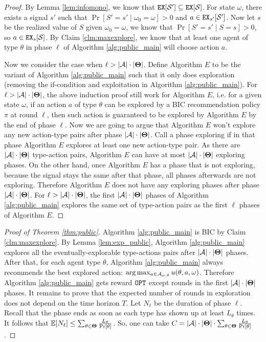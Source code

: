 \begin{proof}
By Lemma \ref{lem:infomono}, we know that $\mathtt{EX}[\mathcal{S}'] \subseteq \mathtt{EX}[\mathcal{S}]$. For state $\omega$, there exists a signal $s'$ such that $\Pr[S'=s'\mid \omega_0 =\omega] >0 $ and $a \in \mathtt{EX}_{s'} [\mathcal{S}']$. Now let $s$ be the realized value of $S$ given $\omega_0 = \omega$, we know that $\Pr[S'=s'\mid S=s] >0$, so $a \in \mathtt{EX}_s[\mathcal{S}]$. By Claim \ref{clm:maxexplore}, we know that at least one agent of type $\theta$ in phase $\ell$ of Algorithm \ref{alg:public_main} will choose action $a$.

Now we consider the case when $\ell > |\mathcal{A}| \cdot |\bold{\Theta}|$. Define Algorithm $E$ to be the variant of Algorithm \ref{alg:public_main} such that it only does exploration (removing the if-condition and exploitation in Algorithm \ref{alg:public_main}). For $\ell > |\mathcal{A}| \cdot |\bold{\Theta}|$, the above induction proof still work for Algorithm $E$, i.e. for a given state $\omega$, if an action $a$ of type $\theta$ can be explored by a BIC recommendation policy $\pi$ at round $\ell$, then such action is guaranteed to be explored by Algorithm $E$ by the end of phase $\ell$. Now we are going to argue that Algorithm $E$ won't explore any new action-type pairs after phase $|\mathcal{A}| \cdot |\bold{\Theta}|$. Call a phase exploring if in that phase Algorithm $E$ explores at least one new action-type pair. As there are  $ |\mathcal{A}| \cdot |\bold{\Theta}|$ type-action pairs, Algorithm $E$ can have at most $ |\mathcal{A}| \cdot |\bold{\Theta}|$ exploring phases. On the other hand, once Algorithm $E$ has a phase that is not exploring, because the signal stays the same after that phase, all phases afterwards are not exploring. Therefore Algorithm $E$ does not have any exploring phases after phase $|\mathcal{A}| \cdot |\bold{\Theta}|$. For $\ell > |\mathcal{A}| \cdot |\bold{\Theta}|$, the first $|   \mathcal{A}| \cdot |\bold{\Theta}|$ phases of Algorithm \ref{alg:public_main} explores the same set of type-action pairs as the first $\ell$ phases of Algorithm $E$.
\end{proof}

\begin{proof}[Proof of Theorem \ref{thm:public}]
Algorithm \ref{alg:public_main} is BIC  by Claim \ref{clm:maxexplore}. By Lemma \ref{lem:exp_public}, Algorithm \ref{alg:public_main} explores all the eventually-explorable type-actions pairs after $|\mathcal{A}|\cdot |\bold{\Theta}|$ phases. After that, for each agent type $\theta$, Algorithm \ref{alg:public_main} always recommends the best explored action: $ \arg\max_{a \in \mathcal{A}_{\omega,\theta}} u(\theta, a, \omega)$. Therefore Algorithm \ref{alg:public_main} gets reward $\mathtt{OPT}$ except rounds in the first $|\mathcal{A}|\cdot |\bold{\Theta}|$ phases.  It remains to prove that the expected number of rounds in exploration does not depend on the time horizon $T$. Let $N_\ell$ be the duration of phase $\ell$.
Recall that the phase ends as soon as each type has shown up at least $L_{\theta}$ times. It follows that
$ \mathbb{E}[N_\ell] \leq  \sum_{\theta\in\bold{\Theta}} \frac{L_{\theta}}{\Pr[\theta]}$.
So, one can take $C = |\mathcal{A}|\cdot |\bold{\Theta}|\cdot \sum_{\theta\in\bold{\Theta}} \frac{L_{\theta}}{\Pr[\theta]}$.
\end{proof} 